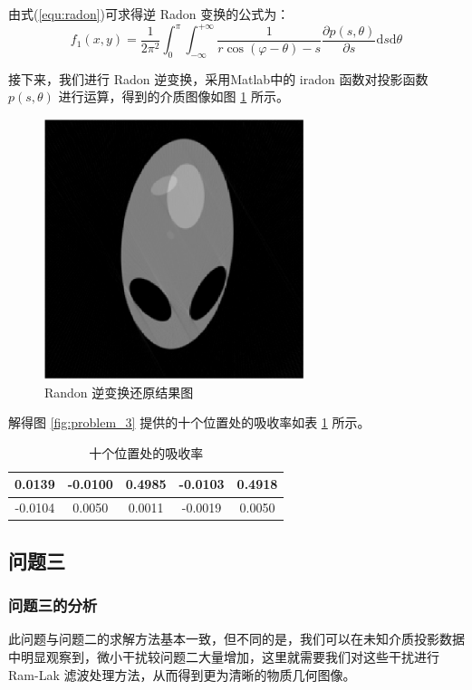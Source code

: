 \documentclass[UTF8]{ctexart}
\begin{document}
由式(\ref{equ:radon})可求得逆 Radon 变换的公式为：
$$ f_1(x,y)=\frac{1}{2\pi^2}\int_0^\pi\int_{-\infty}^{+\infty}\frac{1}{r\cos(\varphi-\theta)-s}\frac{\partial p(s,\theta)}{\partial s}\mathrm{d}s\mathrm{d}\theta $$

接下来，我们进行 Radon 逆变换，采用Matlab中的 iradon 函数对投影函数 $p(s,\theta)$ 进行运算，得到的介质图像如图 \ref{fig:answer_2} 所示。

\begin{figure}[htbp]
  \centering
  \includegraphics[width=3in]{../figure/answer_2.png}
  \caption{Randon 逆变换还原结果图}
  \label{fig:answer_2}
\end{figure}

解得图 \ref{fig:problem_3} 提供的十个位置处的吸收率如表 \ref{problem_2} 所示。

\begin{table}[htbp]
\centering
\caption{十个位置处的吸收率}
\label{problem_2}
\begin{tabular}{ccccc}
\hline
0.0139 & -0.0100 & 0.4985 & -0.0103 & 0.4918  \\
\hline
-0.0104 & 0.0050 & 0.0011 & -0.0019 & 0.0050  \\
\hline
\end{tabular}
\end{table}

\subsection{问题三}
\subsubsection{问题三的分析}

此问题与问题二的求解方法基本一致，但不同的是，我们可以在未知介质投影数据中明显观察到，微小干扰较问题二大量增加，这里就需要我们对这些干扰进行 Ram-Lak 滤波处理方法，从而得到更为清晰的物质几何图像。
\end{document}
